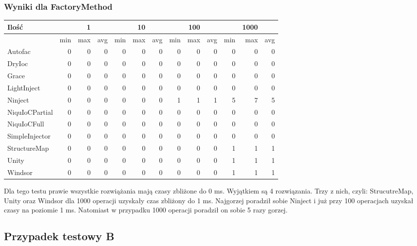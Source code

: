 \documentclass[12pt]{article}
\begin{document}
\subsubsection{Wyniki dla FactoryMethod}
\begin{center}
\begin{small}
	\begin{tabular}{ | l | r r r | r r r | r r r | r r r | }
    		\hline
Ilość & & 1 & & & 10 & & & 100 & & & 1000 & \\ \hline
 & min & max & avg & min & max & avg & min & max & avg & min & max & avg \\ \hline
Autofac & 0 & 0 & 0 & 0 & 0 & 0 & 0 & 0 & 0 & 0 & 0 & 0 \\ \hline
DryIoc & 0 & 0 & 0 & 0 & 0 & 0 & 0 & 0 & 0 & 0 & 0 & 0 \\ \hline
Grace & 0 & 0 & 0 & 0 & 0 & 0 & 0 & 0 & 0 & 0 & 0 & 0 \\ \hline
LightInject & 0 & 0 & 0 & 0 & 0 & 0 & 0 & 0 & 0 & 0 & 0 & 0 \\ \hline
Ninject & 0 & 0 & 0 & 0 & 0 & 0 & 1 & 1 & 1 & 5 & 7 & 5 \\ \hline
NiquIoCPartial & 0 & 0 & 0 & 0 & 0 & 0 & 0 & 0 & 0 & 0 & 0 & 0 \\ \hline
NiquIoCFull & 0 & 0 & 0 & 0 & 0 & 0 & 0 & 0 & 0 & 0 & 0 & 0 \\ \hline
SimpleInjector & 0 & 0 & 0 & 0 & 0 & 0 & 0 & 0 & 0 & 0 & 0 & 0 \\ \hline
StructureMap & 0 & 0 & 0 & 0 & 0 & 0 & 0 & 0 & 0 & 1 & 1 & 1 \\ \hline
Unity & 0 & 0 & 0 & 0 & 0 & 0 & 0 & 0 & 0 & 1 & 1 & 1 \\ \hline
Windsor & 0 & 0 & 0 & 0 & 0 & 0 & 0 & 0 & 0 & 1 & 1 & 1 \\ \hline
  	\end{tabular}
\end{small}
\end{center}
Dla tego testu prawie wszystkie rozwiążania mają czasy zbliżone do 0 ms. Wyjątkiem są 4 rozwiązania. Trzy z nich, czyli: StrucutreMap, Unity oraz Windsor dla 1000 operacji uzyskały czas zbliżony do 1 ms. Najgorzej poradził sobie Ninject i już przy 100 operacjach uzyskał czasy na poziomie 1 ms. Natomiast w przypadku 1000 operacji poradził on sobie 5 razy gorzej.


\subsection{Przypadek testowy B}
\end{document}
